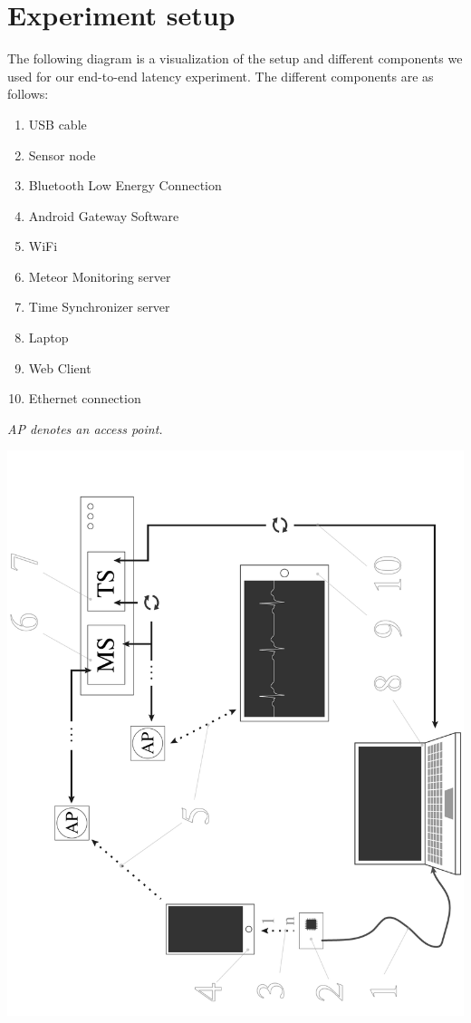 \section{Experiment setup} %
\label{sec:experiment_setup}

The following diagram is a visualization of the setup and different components we used for our end-to-end latency experiment. The different components are as follows: 
     
\begin{enumerate}

  \item USB cable

  \item Sensor node

  \item Bluetooth Low Energy Connection

  \item Android Gateway Software

  \item WiFi

  \item Meteor Monitoring server

  \item Time Synchronizer server

  \item Laptop

  \item Web Client

  \item Ethernet connection

\end{enumerate}

\textit{AP denotes an access point.}

\includegraphics[scale=.25]{img/figures/end-to-end4.png}